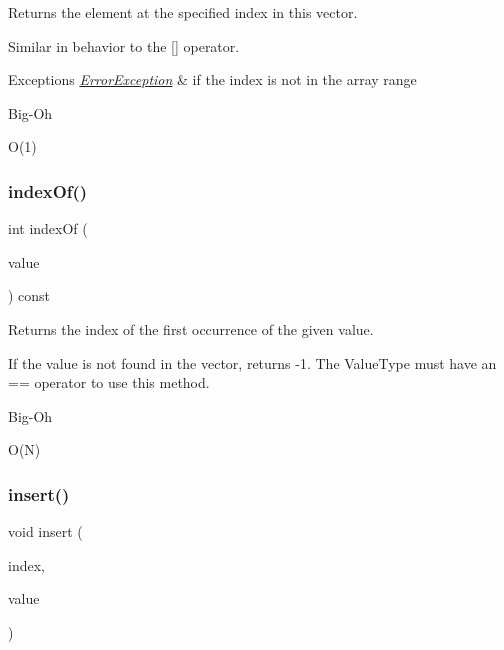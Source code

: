 Returns the element at the specified index in this vector. 

Similar in behavior to the \mbox{[}\mbox{]} operator. 
\begin{DoxyExceptions}{Exceptions}
{\em \mbox{\hyperlink{classErrorException}{Error\+Exception}}} & if the index is not in the array range \\
\hline
\end{DoxyExceptions}
\begin{DoxyRefDesc}{Big-\/\+Oh}
\item[\mbox{\hyperlink{BigOh__BigOh000114}{Big-\/\+Oh}}]O(1) \end{DoxyRefDesc}
\mbox{\label{classVector_a619aacfb96804495d3182a7131cf3539}} 
\subsubsection{\texorpdfstring{index\+Of()}{indexOf()}}
{\footnotesize\ttfamily int index\+Of (\begin{DoxyParamCaption}\item[{const Value\+Type \&}]{value }\end{DoxyParamCaption}) const}



Returns the index of the first occurrence of the given value. 

If the value is not found in the vector, returns -\/1. The Value\+Type must have an == operator to use this method. \begin{DoxyRefDesc}{Big-\/\+Oh}
\item[\mbox{\hyperlink{BigOh__BigOh000115}{Big-\/\+Oh}}]O(\+N) \end{DoxyRefDesc}
\mbox{\label{classVector_a0b5f5f8e87079d043caa9e5ed00d2941}} 
\subsubsection{\texorpdfstring{insert()}{insert()}}
{\footnotesize\ttfamily void insert (\begin{DoxyParamCaption}\item[{int}]{index,  }\item[{const Value\+Type \&}]{value }\end{DoxyParamCaption})}



